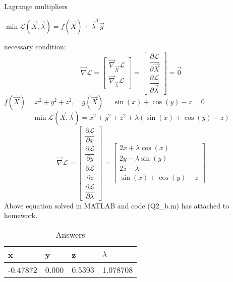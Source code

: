 Lagrange multipliers


$\min \mathcal{L}(\vec{X}, \vec{\lambda}) = f(\vec{X}) +\vec{\lambda}^T \vec{g}$

necessary condition:
$$\vec{\nabla} \mathcal{L}  =  \begin{bmatrix}
	 \vec{\nabla}_{\vec{X}} \mathcal{L} \\[6pt]
	 \vec{\nabla}_{\vec{\lambda}} \mathcal{L}
\end{bmatrix} = \begin{bmatrix}
\dfrac{\partial \mathcal{L}}{\partial \vec{X}} \\[10pt]
\dfrac{\partial \mathcal{L}}{\partial \vec{\lambda}}
\end{bmatrix} = \vec{0}$$
$f(\vec{X}) = x^2 + y^2 + z^2, \quad  g(\vec{X}) = \sin(x) + \cos(y) - z = 0$
$$\min \mathcal{L}(\vec{X}, \vec{\lambda}) = x^2 + y^2 + z^2 + \lambda (\sin(x) + \cos(y) - z)$$
$$\vec{\nabla} \mathcal{L} = \begin{bmatrix}
	\dfrac{\partial \mathcal{L}}{\partial x} \\[10pt]
	\dfrac{\partial \mathcal{L}}{\partial y} \\[10pt]
	\dfrac{\partial \mathcal{L}}{\partial z} \\[10pt]
	\dfrac{\partial \mathcal{L}}{\partial \lambda}
\end{bmatrix}  = \begin{bmatrix}
2x + \lambda\cos(x) \\
2y - \lambda\sin(y) \\
2z - \lambda \\
\sin(x) + \cos(y) -z
\end{bmatrix}$$
Above equation solved in MATLAB and code (Q2\_b.m) has attached to homework.
\begin{table}[H]
	\caption {Answers} \label{ans} 
	\begin{center}
		\begin{tabular}{| l | l | l | l |}
			\hline
			x & y & z & $\lambda$ \TBstrut \\
			\hline
			-0.47872 & 0.000 & 0.5393 & 1.078708 \Tstrut\\
			\hline
		\end{tabular}
	\end{center}
\end{table}
